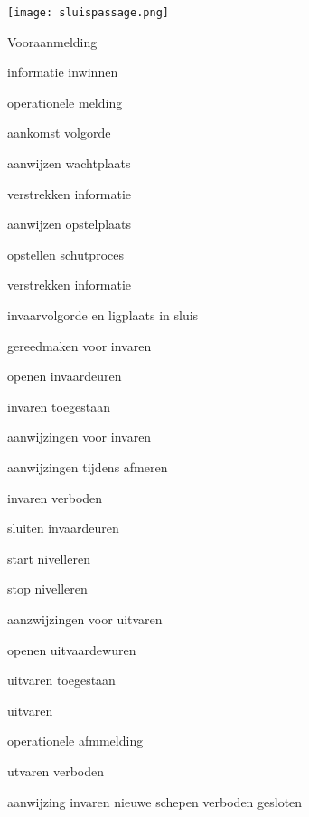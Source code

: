 
\texttt{[image: sluispassage.png]}


\begin{itemize}
\begin{minipage}{0.4\linewidth}
\item Vooraanmelding
\item informatie inwinnen
\item operationele melding
\item aankomst volgorde
\item aanwijzen wachtplaats
\item verstrekken informatie
\item aanwijzen opstelplaats
\item opstellen schutproces
\item verstrekken informatie
\item invaarvolgorde en ligplaats in sluis

\end{minipage}
\begin{minipage}{0.4\linewidth}

\item gereedmaken voor invaren
\item openen invaardeuren
\item invaren toegestaan
\item aanwijzingen voor invaren
\item aanwijzingen tijdens afmeren
\item invaren verboden
\item sluiten invaardeuren
\item start nivelleren
\item stop nivelleren
\item aanzwijzingen voor uitvaren
\item openen uitvaardewuren
\item uitvaren toegestaan

\end{minipage}
\begin{minipage}{0.4\linewidth}
\item uitvaren
\item operationele afmmelding
\item utvaren verboden
\item aanwijzing invaren nieuwe schepen
\invaren verboden
\deuren gesloten
\end{minipage}
\end{itemize}


